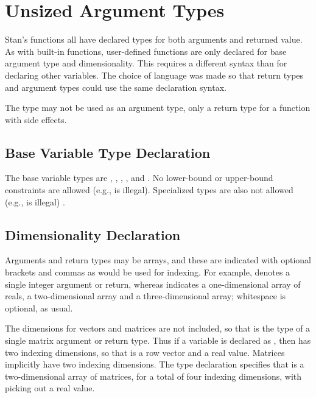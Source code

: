 \section{Unsized Argument Types}

Stan's functions all have declared types for both arguments and
returned value.  As with built-in functions, user-defined functions are
only declared for base argument type and dimensionality.  This
requires a different syntax than for declaring other variables.  The
choice of language was made so that return types and argument types
could use the same declaration syntax.

The type  may not be used as an argument type, only a
return type for a function with side effects.


\subsection{Base Variable Type Declaration}

The base variable types are , ,
, , and .  No lower-bound
or upper-bound constraints are allowed (e.g.,  is
illegal).  Specialized types are also not allowed (e.g.,
 is illegal) .

\subsection{Dimensionality Declaration}

Arguments and return types may be arrays, and these are indicated with
optional brackets and commas as would be used for indexing.  For
example,  denotes a single integer argument or return,
whereas  indicates a one-dimensional array of reals,
 a two-dimensional array and  a
three-dimensional array; whitespace is optional, as usual.

The dimensions for vectors and matrices are not included, so that
 is the type of a single matrix argument or return type.
Thus if a variable is declared as , then  has
two indexing dimensions, so that  is a row vector and
 a real value.  Matrices implicitly have two indexing
dimensions.  The type declaration  specifies that
 is a two-dimensional array of matrices, for a total of four
indexing dimensions, with  picking out a real value.

